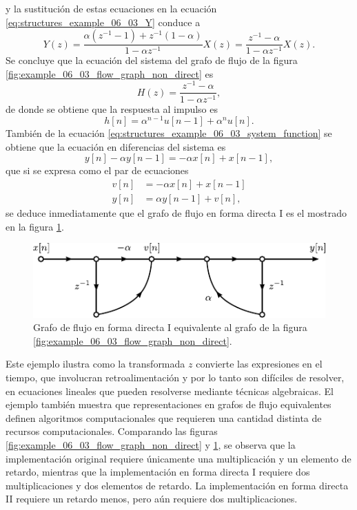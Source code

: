 \documentclass[a4paper]{report}
\begin{document}
y la sustitución de estas ecuaciones en la ecuación \ref{eq:structures_example_06_03_Y} conduce a 
\begin{equation}\label{eq:structures_example_06_03_system_function}
 Y(z)=\frac{\alpha(z^{-1}-1)+z^{-1}(1-\alpha)}{1-\alpha z^{-1}}X(z)
  =\frac{z^{-1}-\alpha}{1-\alpha z^{-1}}X(z). 
\end{equation}
Se concluye que la ecuación del sistema del grafo de flujo de la figura \ref{fig:example_06_03_flow_graph_non_direct} es
\[
 H(z)=\frac{z^{-1}-\alpha}{1-\alpha z^{-1}},
\]
de donde se obtiene que la respuesta al impulso es
\[
 h[n]=\alpha^{n-1}u[n-1]+\alpha^nu[n].
\]
También de la ecuación \ref{eq:structures_example_06_03_system_function} se obtiene que la ecuación en diferencias del sistema es
\[
 y[n]-\alpha y[n-1]=-\alpha x[n]+x[n-1],
\]
que si se expresa como el par de ecuaciones
\begin{align*}
 v[n]&=-\alpha x[n]+x[n-1]\\
 y[n]&=\alpha y[n-1]+v[n],
\end{align*}
se deduce inmediatamente que el grafo de flujo en forma directa I es el mostrado en la figura \ref{fig:example_06_03_flow_graph_direct_form_I}.
\begin{figure}[!htb]
 \begin{minipage}[c]{0.65\textwidth}
  \includegraphics[width=\textwidth]{figuras/example_06_03_flow_graph_direct_form_I.pdf}
 \end{minipage}\hfill
 \begin{minipage}[c]{0.25\textwidth}
  \caption{
   Grafo de flujo en forma directa I equivalente al grafo de la figura \ref{fig:example_06_03_flow_graph_non_direct}. 
   }\label{fig:example_06_03_flow_graph_direct_form_I}
 \end{minipage}
\end{figure} 
Este ejemplo ilustra como la transformada \(z\) convierte las expresiones en el tiempo, que involucran retroalimentación y por lo tanto son difíciles de resolver, en ecuaciones lineales que pueden resolverse mediante técnicas algebraicas. El ejemplo también muestra que representaciones en grafos de flujo equivalentes definen algoritmos computacionales que requieren una  cantidad distinta de recursos computacionales. Comparando las figuras \ref{fig:example_06_03_flow_graph_non_direct} y \ref{fig:example_06_03_flow_graph_direct_form_I}, se observa que la implementación original requiere únicamente una multiplicación y un elemento de retardo, mientras que la implementación en forma directa I requiere dos multiplicaciones y dos elementos de retardo. La implementación en forma directa II requiere un retardo menos, pero aún requiere dos multiplicaciones.
\end{document}

